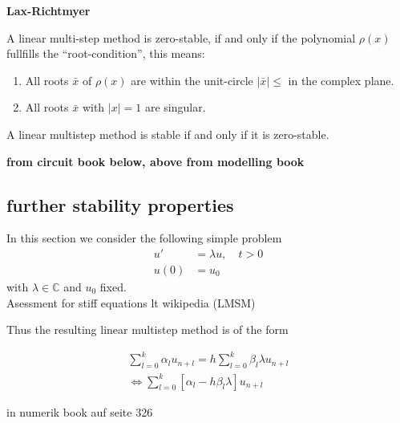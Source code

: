	\textbf{Lax-Richtmyer}
	
	\begin{theorem}
		A linear multi-step method is zero-stable, if and only if the polynomial $\rho(x)$ fullfills the ``root-condition'', this means:
		\begin{enumerate}
			\item All roots $\bar{x}$ of $\rho(x)$ are within the unit-circle $|\bar{x}| \leq$ in the complex plane.
			\item All roots $\bar{x}$ with $|x| = 1$ are singular.
		\end{enumerate}
	\end{theorem}
	
	\begin{theorem}
		A linear multistep method is stable if and only if it is zero-stable.
	\end{theorem}
	
	\textbf{from circuit book below, above from modelling book}
	
	\subsection{further stability properties}
	
	In this section we consider the following simple problem
	\begin{align}
		u' &= \lambda u, \quad t > 0 \\
		u(0) &= u_0
	\end{align}
	with $\lambda \in \mathbb{C}$ and $u_0$ fixed.\\
	
	Asessment for stiff equations lt wikipedia (LMSM)
	
	Thus the resulting linear multistep method is of the form
	
	\begin{align*}
		\sum_{l=0}^{k} \alpha_l u_{n+l} = h \sum_{l=0}^{k} \beta_l \lambda u_{n+l} \\
		\iff \sum_{l=0}^{k}  [\alpha_l - h \beta_l \lambda] u_{n+l}
	\end{align*}
	
	in numerik book auf seite 326
	
